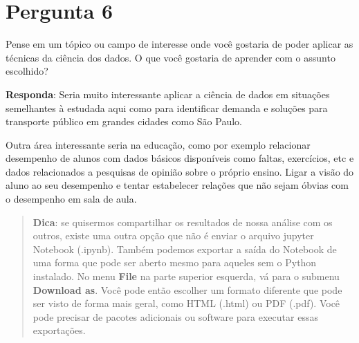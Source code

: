 \documentclass[11pt]{article}
\begin{document}
    \section{Pergunta 6}\label{pergunta-6}

Pense em um tópico ou campo de interesse onde você gostaria de poder
aplicar as técnicas da ciência dos dados. O que você gostaria de
aprender com o assunto escolhido?

\textbf{Responda}: Seria muito interessante aplicar a ciência de dados
em situações semelhantes à estudada aqui como para identificar demanda e
soluções para transporte público em grandes cidades como São Paulo.

Outra área interessante seria na educação, como por exemplo relacionar
desempenho de alunos com dados básicos disponíveis como faltas,
exercícios, etc e dados relacionados a pesquisas de opinião sobre o
próprio ensino. Ligar a visão do aluno ao seu desempenho e tentar
estabelecer relações que não sejam óbvias com o desempenho em sala de
aula.

    \begin{quote}
\textbf{Dica}: se quisermos compartilhar os resultados de nossa análise
com os outros, existe uma outra opção que não é enviar o arquivo jupyter
Notebook (.ipynb). Também podemos exportar a saída do Notebook de uma
forma que pode ser aberto mesmo para aqueles sem o Python instalado. No
menu \textbf{File} na parte superior esquerda, vá para o submenu
\textbf{Download as}. Você pode então escolher um formato diferente que
pode ser visto de forma mais geral, como HTML (.html) ou PDF (.pdf).
Você pode precisar de pacotes adicionais ou software para executar essas
exportações.
\end{quote}


    
    
    
    
\end{document}
